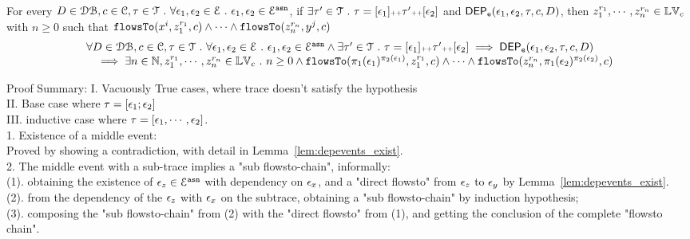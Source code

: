 %
\begin{thm}
\label{thm:flowsto_event_soundness}
For every $D \in \mathcal{DB} , c \in \mathcal{C}, \mathtt{\tau} \in \mathcal{T} ~.~ \forall \mathtt{\epsilon}_1, \mathtt{\epsilon}_2 \in \mathcal{E} ~.~
\mathtt{\epsilon}_1, \mathtt{\epsilon}_2 \in \mathcal{E}^{\mathtt{{asn}}}$, 
if $\exists \mathtt{\tau}' \in \mathcal{T} ~.~ \mathtt{\tau} = [\mathtt{\epsilon}_1] {\scriptscriptstyle ++} \mathtt{\tau}' {\scriptscriptstyle ++} [\mathtt{\epsilon}_2]$ and 
$\mathsf{DEP_{\mathtt{e}}}(\mathtt{\epsilon}_1, \mathtt{\epsilon}_2, \mathtt{\tau}, c, D) $, then
 $z_1^{r_1}, \cdots, z_n^{r_n} \in \mathbb{LV}_{{c}}$ with $n \geq 0$ such that   
$\mathtt{flowsTo}(x^i,  z_1^{r_1}, c) 
\land \cdots \land \mathtt{flowsTo}(z_n^{r_n}, y^j, c)$
%
\[
  \begin{array}{l}
		\forall D \in \mathcal{DB} , c \in \mathcal{C}, \mathtt{\tau} \in \mathcal{T} ~.~ \forall \mathtt{\epsilon}_1, \mathtt{\epsilon}_2 \in \mathcal{E} ~.~
    \mathtt{\epsilon}_1, \mathtt{\epsilon}_2 \in \mathcal{E}^{\mathtt{{asn}}} \land 
		 \exists \mathtt{\tau}' \in \mathcal{T} ~.~ \mathtt{\tau} = [\mathtt{\epsilon}_1] {\scriptscriptstyle ++} \mathtt{\tau}' {\scriptscriptstyle ++} [\mathtt{\epsilon}_2]
		\implies
		\mathsf{DEP_{\mathtt{e}}}(\mathtt{\epsilon}_1, \mathtt{\epsilon}_2, \mathtt{\tau}, c, D) 
		\\ \quad 
		\implies 
    \exists n \in \mathbb{N}, z_1^{r_1}, \cdots, z_n^{r_n} \in \mathbb{LV}_{{c}} ~.~ n \geq 0 \land
		\mathtt{flowsTo}(\pi_1(\mathtt{\epsilon}_1)^{\pi_2(\mathtt{\epsilon}_1)},  z_1^{r_1}, c) 
    \land \cdots \land \mathtt{flowsTo}(z_n^{r_n}, \pi_1(\mathtt{\epsilon}_2)^{\pi_2(\mathtt{\epsilon}_2)}, c) 
	\end{array}
\]
\end{thm}
Proof Summary:
I. Vacuously True cases, where trace doesn't satisfy the hypothesis 
\\
II. Base case where $\mathtt{\tau} = [\mathtt{\epsilon}_1;\mathtt{\epsilon}_2]$
\\
III. inductive case where $\mathtt{\tau} = [\mathtt{\epsilon}_1, \cdots, \mathtt{\epsilon}_2]$.
\\
1. Existence of a middle event:
\\
Proved by showing a contradiction, with detail in Lemma~\ref{lem:depevents_exist}.
%
\\
2. The middle event with a sub-trace implies a "sub flowsto-chain", informally:
%
\\
(1). obtaining the existence of $\mathtt{\epsilon}_z \in \mathcal{E}^{\mathtt{{asn}}} $ with dependency on $\mathtt{\epsilon}_x$, and a "direct flowsto" from $\mathtt{\epsilon}_z$ to $\mathtt{\epsilon}_y$
by Lemma~\ref{lem:depevents_exist}.
 \\
(2). from the dependency of the $\mathtt{\epsilon}_z$ with $\mathtt{\epsilon}_x$ on the subtrace,
 obtaining a "sub flowsto-chain" by induction  hypothesis;
 \\
(3). composing the "sub flowsto-chain" from (2) with the  "direct flowsto" from (1), and getting the conclusion of
 the complete "flowsto chain".
%
